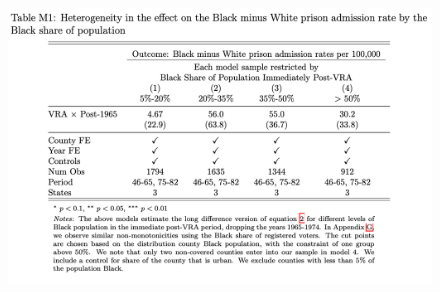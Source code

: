 \documentclass[12pt]{article}
\begin{document}
\begin{figure}[bh!]
	\centering
	\includegraphics[width=\textwidth]{../../60_appendix_cty_results/table_m1.png}
\end{figure}
\end{document}

